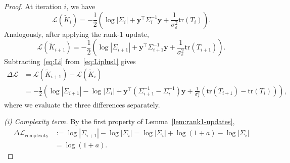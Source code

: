 \documentclass[onefignum,onetabnum]{siamart250211}
\newcommand{\tr}{\mathrm{tr}}
\begin{document}
\begin{proof}
    At iteration $i$, we have
    \begin{equation}
    \mathcal L(\widetilde K_i)
        =
        -\frac12\left(
        \log|\Sigma_i|
        +
        \bm y^\top\Sigma_i^{-1}\bm y
        +
        \frac{1}{\sigma_\varepsilon^2}\tr(T_i)
        \right).
    \label{eq:Li}
    \end{equation}
    Analogously, after applying the rank-1 update,
    \begin{equation}
        \mathcal L(\widetilde K_{i+1})
        =
        -\frac12\left(
        \log|\Sigma_{i+1}|
        +
        \bm y^\top\Sigma_{i+1}^{-1}\bm y
        +
        \frac{1}{\sigma_\varepsilon^2}\tr(T_{i+1})
        \right).
    \label{eq:Liplus1}
    \end{equation}
    Subtracting~\eqref{eq:Li} from~\eqref{eq:Liplus1} gives
    \begin{align}
        \Delta \mathcal L
        &=
        \mathcal L(\widetilde K_{i+1})-\mathcal L(\widetilde K_i) \nonumber \\
        &=
        -\frac12\left(
        \log|\Sigma_{i+1}|-\log|\Sigma_i|
        +
        \bm y^\top(\Sigma_{i+1}^{-1}-\Sigma_i^{-1})\bm y
        +
        \frac{1}{\sigma_\varepsilon^2}
        (\tr(T_{i+1})-\tr(T_i))
        \right),
    \label{eq:DeltaLDecomp}
    \end{align}
    where we evaluate the three differences separately.
    
    \noindent
    \emph{(i) Complexity term.}
    By the first property of Lemma~\ref{lem:rank1-updates},
    \begin{align*}
        \Delta\mathcal{L}_{\text{complexity}} &:= \log|\Sigma_{i+1}|-\log|\Sigma_i| =\log |\Sigma_i| + \log \left(1 + a \right) - \log| \Sigma_i|
        \\
        &=
        \log(1+a).
    \end{align*}
    

\end{proof}
\end{document}
